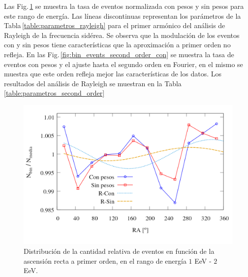 Las Fig.\,\ref{fig:bin_events_first_order} se muestra la tasa de eventos normalizada con pesos y sin pesos para este rango de energía. Las líneas discontinuas representan los parámetros de la Tabla\,\ref{table:parametros_rayleigh} para el primer armónico del análisis de Rayleigh de la frecuencia sidérea. Se observa que la modulación de los eventos con y sin pesos tiene características que la aproximación a primer orden no refleja. 	En las Fig.\,\ref{fig:bin_events_second_order_con} se muestra la tasa de eventos con pesos y el ajuste hasta el segundo orden en Fourier, en el mismo se muestra que este orden refleja mejor las características de los datos. Los resultados del análisis de Rayleigh  se muestran en la Tabla\,\ref{table:parametros_second_order}
	\begin{figure}[H]
		\centering
		\includegraphics[width=0.65\linewidth]{eventos_clasificados_por_RA_v4.png}
		\caption{Distribución de la cantidad relativa de eventos en función de la ascensión recta a primer orden, en el rango de energía $1$ EeV - $2$ EeV.}
		\label{fig:bin_events_first_order}
	\end{figure}

